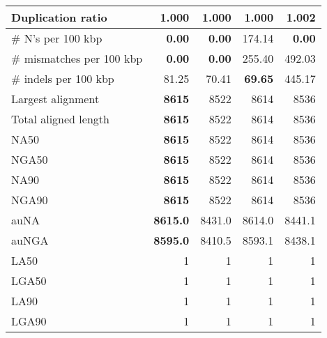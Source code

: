 \documentclass[12pt,a4paper]{article}
\begin{document}
\begin{table}[ht]
\begin{center}
\begin{tabular}{|l*{4}{|r}|}
Duplication ratio & {\bf 1.000} & {\bf 1.000} & {\bf 1.000} & 1.002 \\ \hline
\# N's per 100 kbp & {\bf 0.00} & {\bf 0.00} & 174.14 & {\bf 0.00} \\ \hline
\# mismatches per 100 kbp & {\bf 0.00} & {\bf 0.00} & 255.40 & 492.03 \\ \hline
\# indels per 100 kbp & 81.25 & 70.41 & {\bf 69.65} & 445.17 \\ \hline
Largest alignment & {\bf 8615} & 8522 & 8614 & 8536 \\ \hline
Total aligned length & {\bf 8615} & 8522 & 8614 & 8536 \\ \hline
NA50 & {\bf 8615} & 8522 & 8614 & 8536 \\ \hline
NGA50 & {\bf 8615} & 8522 & 8614 & 8536 \\ \hline
NA90 & {\bf 8615} & 8522 & 8614 & 8536 \\ \hline
NGA90 & {\bf 8615} & 8522 & 8614 & 8536 \\ \hline
auNA & {\bf 8615.0} & 8431.0 & 8614.0 & 8441.1 \\ \hline
auNGA & {\bf 8595.0} & 8410.5 & 8593.1 & 8438.1 \\ \hline
LA50 & 1 & 1 & 1 & 1 \\ \hline
LGA50 & 1 & 1 & 1 & 1 \\ \hline
LA90 & 1 & 1 & 1 & 1 \\ \hline
LGA90 & 1 & 1 & 1 & 1 \\ \hline
\end{tabular}
\end{center}
\end{table}
\end{document}
